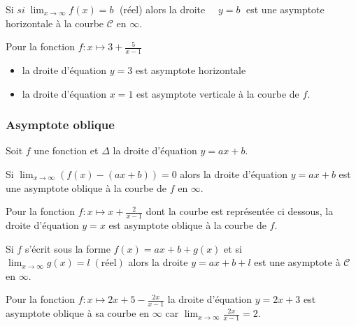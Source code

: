 \begin{definition}
Si $si\;\displaystyle \lim_{x \to \infty}f(x)=b \;$ (réel) alors  la droite  $\quad y = b \;$  est une  asymptote horizontale à  la courbe $\mathcal{C} $   en $\infty$.
\end{definition}

\begin{example}
Pour la fonction $f : x\mapsto 3+ \frac{5}{x-1} $ 
\begin{itemize}
\item la droite d'équation   $y = 3 $ est asymptote  horizontale  
\item la droite d'équation $x = 1$ est asymptote verticale à la courbe de $f.$
\end{itemize}
\end{example}

\subsubsection*{Asymptote oblique}
\begin{definition}
Soit $f$ une fonction et $ \Delta $ la droite d'équation  $y=ax+b$.

Si $\displaystyle \lim_{x \to \infty}\left(f(x)-(ax+b)\right)=0$  alors  la droite  d'équation  $y=ax+b$  est une  asymptote oblique  à la courbe de $f$ en  $\infty$.
\end{definition}
\begin{example}
Pour la fonction $f : x\mapsto x+ \frac{2}{x-1} $ dont la courbe est représentée ci dessous,
la droite d'équation   $y = x $ est asymptote oblique à la courbe de $f$.

\end{example}

\begin{remark} 
Si $ f $ s'écrit sous la forme $ f(x)= ax+b + g(x) $ et si $ \displaystyle \lim_{x \to \infty}g(x)=l\; (\text{réel} )$   alors la droite $ y=ax+b+l $ est une asymptote à  $ \mathcal{C} $ en $ \infty. $
\end{remark}
\begin{example}
Pour la fonction $f : x\mapsto 2x+5- \frac{2x}{x-1} $ 
la droite d'équation   $y = 2x+3 $ est asymptote oblique à sa courbe en $ \infty$ car  $\displaystyle \lim_{x \to \infty}\frac{2x}{x-1}=2$.
\end{example}
